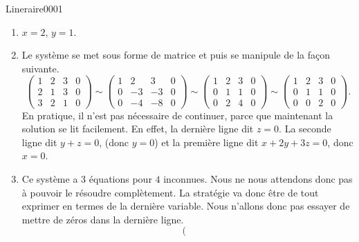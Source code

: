 \begin{corrige}{Lineraire0001}

	\begin{enumerate}

		\item
			$x=2$, $y=1$.
		\item
			Le système se met sous forme de matrice et puis se manipule de la façon suivante.
			\begin{equation}
				\left(
				\begin{array}{ccc|c}
					 1	&	2	&	3	&	0	\\ 
					  2	&	1	&	3	&	0	\\ 
					   3	&	2	&	1	&	0	 
				\end{array}
				\right)
				\sim
				\left(\begin{array}{ccc|c}
					 1	&	2	&	3&	0	\\ 
					  0	&	-3	&	-3	&	0	\\ 
					   0	&	-4	&	-8	&	0	 
				   \end{array}
				   \right)
				   \sim
				   \left(\begin{array}{ccc|c}
					    1	&	2	&	3	&	0	\\ 
					     0	&	1	&	1	&	0	\\ 
					      0	&	2	&	4	&	0 
				      \end{array}\right)
				      \sim
				      \left(\begin{array}{ccc|c}
					       1	&	2	&	3	&	0	\\ 
					        0	&	1	&	1	&	0	\\ 
						 0	&	0	&	2	&	0	 
					 \end{array}\right).
			\end{equation}
			En pratique, il n'est pas nécessaire de continuer, parce que maintenant la solution se lit facilement. En effet, la dernière ligne dit $z=0$. La seconde ligne dit $y+z=0$, (donc $y=0$) et la première ligne dit $x+2y+3z=0$, donc $x=0$.
		\item
			Ce système a $3$ équations pour $4$ inconnues. Nous ne nous attendons donc pas à pouvoir le résoudre complètement. La stratégie va donc être de tout exprimer en termes de la dernière variable. Nous n'allons donc pas essayer de mettre de zéros dans la dernière ligne.
			\begin{equation}
				\left(\begin{array}{cccc|c}

\end{array}
\end{equation}
\end{enumerate}
\end{corrige}
